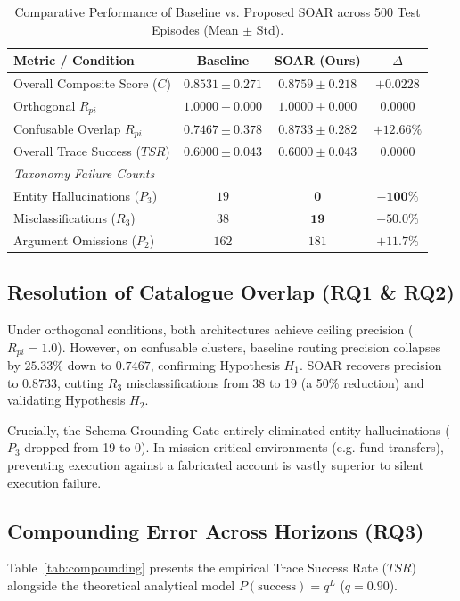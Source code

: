\documentclass[10pt,journal,compsoc]{IEEEtran}
\begin{document}
\begin{table}[htbp]
\caption{Comparative Performance of Baseline vs. Proposed SOAR across 500 Test Episodes (Mean $\pm$ Std).}
\label{tab:main_results}
\centering
\begin{tabular}{lccc}
\toprule
\textbf{Metric / Condition} & \textbf{Baseline} & \textbf{SOAR (Ours)} & \textbf{$\Delta$} \\
\midrule
Overall Composite Score ($C$) & $0.8531 \pm 0.271$ & $\mathbf{0.8759 \pm 0.218}$ & $+0.0228$ \\
Orthogonal $R_{pi}$ & $1.0000 \pm 0.000$ & $1.0000 \pm 0.000$ & $0.0000$ \\
Confusable Overlap $R_{pi}$ & $0.7467 \pm 0.378$ & $\mathbf{0.8733 \pm 0.282}$ & $\mathbf{+12.66\%}$ \\
Overall Trace Success ($TSR$) & $0.6000 \pm 0.043$ & $0.6000 \pm 0.043$ & $0.0000$ \\
\midrule
\multicolumn{4}{l}{\textit{Taxonomy Failure Counts}} \\
Entity Hallucinations ($P_3$) & $19$ & $\mathbf{0}$ & $\mathbf{-100\%}$ \\
Misclassifications ($R_3$) & $38$ & $\mathbf{19}$ & $\mathbf{-50.0\%}$ \\
Argument Omissions ($P_2$) & $162$ & $181$ & $+11.7\%$ \\
\bottomrule
\end{tabular}
\end{table}

\subsection{Resolution of Catalogue Overlap (RQ1 \& RQ2)}
Under orthogonal conditions, both architectures achieve ceiling precision ($R_{pi} = 1.0$). However, on confusable clusters, baseline routing precision collapses by $25.33\%$ down to $0.7467$, confirming Hypothesis $H_1$. SOAR recovers precision to $0.8733$, cutting $R_3$ misclassifications from 38 to 19 (a 50\% reduction) and validating Hypothesis $H_2$.

Crucially, the Schema Grounding Gate entirely eliminated entity hallucinations ($P_3$ dropped from 19 to 0). In mission-critical environments (e.g. fund transfers), preventing execution against a fabricated account is vastly superior to silent execution failure.

\subsection{Compounding Error Across Horizons (RQ3)}
Table~\ref{tab:compounding} presents the empirical Trace Success Rate ($TSR$) alongside the theoretical analytical model $P(\text{success}) = q^L$ ($q = 0.90$).
\end{document}

